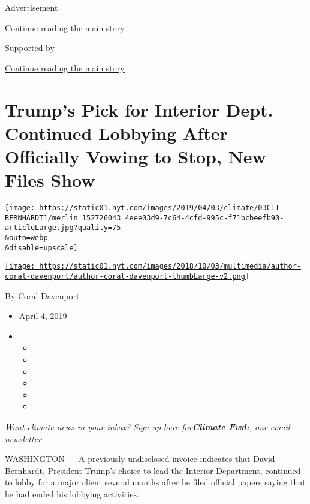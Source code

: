 Advertisement

\protect\hyperlink{after-top}{Continue reading the main story}

Supported by

\protect\hyperlink{after-sponsor}{Continue reading the main story}

\hypertarget{trumps-pick-for-interior-dept-continued-lobbying-after-officially-vowing-to-stop-new-files-show}{%
\section{Trump's Pick for Interior Dept. Continued Lobbying After
Officially Vowing to Stop, New Files
Show}\label{trumps-pick-for-interior-dept-continued-lobbying-after-officially-vowing-to-stop-new-files-show}}

\texttt{[image: https://static01.nyt.com/images/2019/04/03/climate/03CLI-BERNHARDT1/merlin\_152726043\_4eee03d9-7c64-4cfd-995c-f71bcbeefb90-articleLarge.jpg?quality=75\\\&auto=webp\\\&disable=upscale]}

\href{https://www.nytimes.com/by/coral-davenport}{\texttt{[image: https://static01.nyt.com/images/2018/10/03/multimedia/author-coral-davenport/author-coral-davenport-thumbLarge-v2.png]}}

By \href{https://www.nytimes.com/by/coral-davenport}{Coral Davenport}

\begin{itemize}
\item
  April 4, 2019
\item
  \begin{itemize}
  \item
  \item
  \item
  \item
  \item
  \item
  \end{itemize}
\end{itemize}

\emph{Want climate news in your inbox?}
\href{https://www.nytimes.com/newsletters/climate-change}{\emph{Sign up
here
for}}\textbf{\href{https://www.nytimes.com/newsletters/climate-change}{\emph{Climate
Fwd:}}}\emph{, our email newsletter.}

WASHINGTON --- A previously undisclosed invoice indicates that David
Bernhardt, President Trump's choice to lead the Interior Department,
continued to lobby for a major client several months after he filed
official papers saying that he had ended his lobbying activities.

